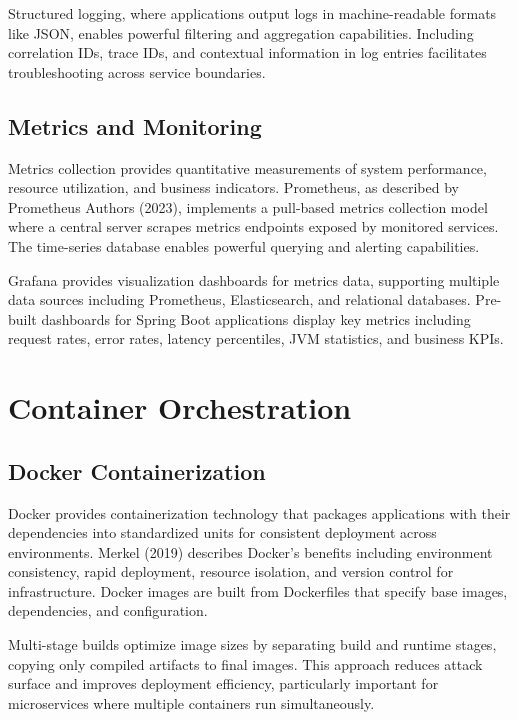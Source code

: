 Structured logging, where applications output logs in machine-readable formats like JSON, enables powerful filtering and aggregation capabilities. Including correlation IDs, trace IDs, and contextual information in log entries facilitates troubleshooting across service boundaries.

\subsection{Metrics and Monitoring}

Metrics collection provides quantitative measurements of system performance, resource utilization, and business indicators. Prometheus, as described by Prometheus Authors (2023), implements a pull-based metrics collection model where a central server scrapes metrics endpoints exposed by monitored services. The time-series database enables powerful querying and alerting capabilities.

Grafana provides visualization dashboards for metrics data, supporting multiple data sources including Prometheus, Elasticsearch, and relational databases. Pre-built dashboards for Spring Boot applications display key metrics including request rates, error rates, latency percentiles, JVM statistics, and business KPIs.

\section{Container Orchestration}

\subsection{Docker Containerization}

Docker provides containerization technology that packages applications with their dependencies into standardized units for consistent deployment across environments. Merkel (2019) describes Docker's benefits including environment consistency, rapid deployment, resource isolation, and version control for infrastructure. Docker images are built from Dockerfiles that specify base images, dependencies, and configuration.

Multi-stage builds optimize image sizes by separating build and runtime stages, copying only compiled artifacts to final images. This approach reduces attack surface and improves deployment efficiency, particularly important for microservices where multiple containers run simultaneously.

